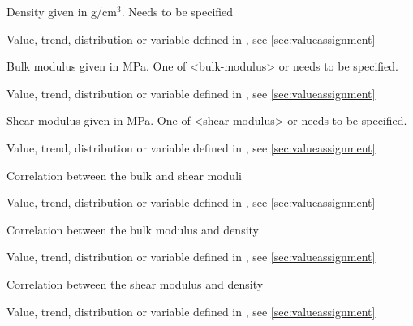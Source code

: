{
 \slist
   \item \Description Density given in g/cm$^3$. Needs to be specified
   \item \Argument Value, trend, distribution or variable defined in , see \autoref{sec:valueassignment}
   \item \Default 
 \elist

 \slist
   \item \Description Bulk modulus given in MPa. One of <bulk-modulus> or  needs to be specified.
   \item \Argument Value, trend, distribution or variable defined in , see \autoref{sec:valueassignment}
   \item \Default 
 \elist

 \slist
   \item \Description Shear modulus given in MPa. One of <shear-modulus> or  needs to be specified.
   \item \Argument Value, trend, distribution or variable defined in , see \autoref{sec:valueassignment}
   \item \Default 
 \elist

 \slist
   \item \Description Correlation between the bulk and shear moduli
   \item \Argument Value, trend, distribution or variable defined in , see \autoref{sec:valueassignment}
   \item {}
 \elist

 \slist
   \item \Description Correlation between the bulk modulus and density
   \item \Argument Value, trend, distribution or variable defined in , see \autoref{sec:valueassignment}
   \item {}
 \elist

 \slist
   \item \Description Correlation between the shear modulus and density
   \item \Argument Value, trend, distribution or variable defined in , see \autoref{sec:valueassignment}
   \item {}
 \elist

}
